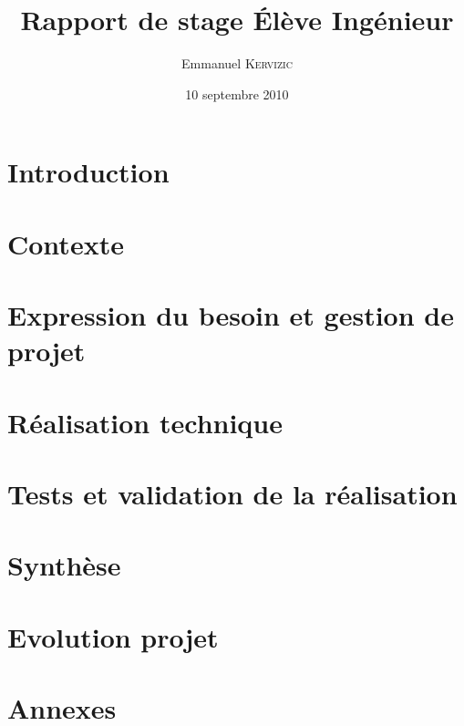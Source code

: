 

\date{10 septembre 2010}
\title{Rapport de stage Élève Ingénieur}
\author{Emmanuel \textsc{Kervizic}}



\renewcommand{\baselinestretch}{1.1}\small \normalsize
\setcounter{tocdepth}{2}  
\tableofcontents
\addtolength{\parskip}{0.5\baselineskip}
\setlength{\parindent}{0pt}
\setlength{\medskipamount}{\parskip}
\renewcommand{\baselinestretch}{1.2}\small \normalsize

\chapter*{Introduction} %


\chapter{Contexte}


\chapter{Expression du besoin et gestion de projet}



\chapter{Réalisation technique}


\chapter{Tests et validation de la réalisation}


\chapter{Synthèse}



\chapter{Evolution projet}





\appendix

\chapter{Annexes}
\renewcommand{\baselinestretch}{1}\small \normalsize






